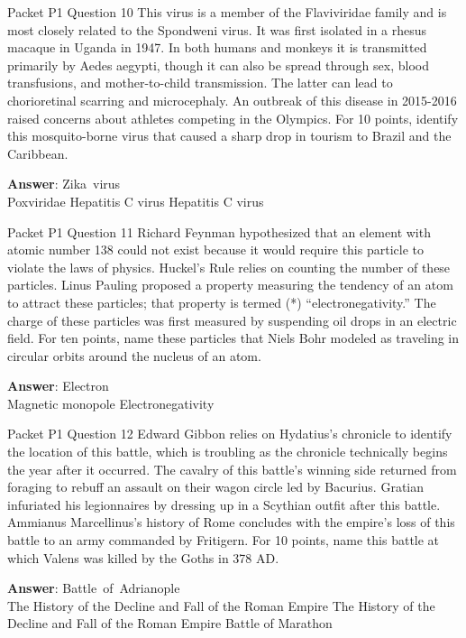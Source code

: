 \begin{frame}{Packet P1 Question 10}
This virus is a member of the Flaviviridae family and is most   closely related to the   Spondweni virus. It was first isolated in a rhesus macaque in Uganda in 1947.     In both humans and monkeys it is transmitted primarily by Aedes aegypti, though it can also be spread through sex, blood transfusions, and mother-to-child transmission. The latter can lead to chorioretinal scarring and microcephaly. An outbreak of this disease in 2015-2016 raised concerns about athletes competing in the Olympics. For 10 points, identify this mosquito-borne virus   that caused a sharp drop in tourism to Brazil and the Caribbean.  

\textbf{Answer}: Zika\ virus\\
 Poxviridae
 Hepatitis C virus
 Hepatitis C virus
\end{frame}

\begin{frame}{Packet P1 Question 11}
Richard Feynman hypothesized that an element with atomic number 138 could not exist because it would require this particle to violate the laws of physics. Huckel's Rule relies on counting   the number of these particles. Linus Pauling proposed a property measuring the tendency of an atom to attract these   particles; that property   is termed (*) ``electronegativity.'' The charge of these   particles was first measured by suspending oil drops in an   electric field. For ten points, name these particles that Niels Bohr modeled as traveling in circular orbits around the   nucleus of an atom.

\textbf{Answer}: Electron\\
 Magnetic monopole
 Electronegativity
\end{frame}

\begin{frame}{Packet P1 Question 12}
Edward Gibbon relies on     Hydatius’s chronicle to identify the location of this battle, which is troubling as the chronicle technically begins the year after it occurred. The cavalry of this battle’s winning side returned from foraging to rebuff an assault on their wagon circle led by Bacurius. Gratian     infuriated his legionnaires by dressing up in a Scythian outfit after this battle. Ammianus Marcellinus's history of Rome concludes with the empire's loss of this battle to an army commanded by Fritigern. For 10 points, name this battle at which Valens was killed by the Goths in   378 AD.  

\textbf{Answer}: Battle\ of\ Adrianople\\
 The History of the Decline and Fall of the Roman Empire
 The History of the Decline and Fall of the Roman Empire
 Battle of Marathon
\end{frame}

